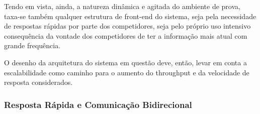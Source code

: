 \documentclass[ruledheader]{abnt}
\begin{document}
Tendo em vista, ainda, a natureza dinâmica e agitada do ambiente de prova, taxa-se também qualquer estrutura de front-end do sistema, seja pela necessidade de respostas rápidas por parte dos competidores, seja pelo próprio uso intensivo consequência da vontade dos competidores de ter a informação mais atual com grande frequência.

O desenho da arquitetura do sistema em questão deve, então, levar em conta a escalabilidade como caminho para o aumento do throughput e da velocidade de resposta considerados.

\subsubsection{Resposta Rápida e Comunicação Bidirecional}








\end{document}
